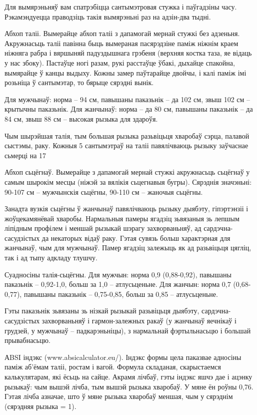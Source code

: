 Для вымярэньняў вам спатрэбіцца сантымэтровая стужка і паўгадзіны часу. Рэкамэндуецца праводзіць такія вымярэньні раз на адзін-два тыдні.

Абхоп таліі. Вымерайце абхоп таліі з дапамогай мернай стужкі без адзеньня. Акружнасьць таліі павінна быць вымераная пасярэдзіне паміж ніжнім краем ніжняга рабра і вяршыняй падуздышнага грэбеня (верхняя костка таза, яе відаць у нас збоку). Пастаўце ногі разам, рукі расстаўце ўбакі, дыхайце спакойна, вымярайце ў канцы выдыху. Кожны замер паўтарайце двойчы, і калі паміж імі розьніца ў сантымэтар, то бярыце сярэдні вынік.

Для мужчынаў: норма – 94 см, павышаны паказьнік – да 102 см, звыш 102 см – крытычны паказьнік. Для жанчынаў: норма – да 80 см, павышаны паказьнік – да 84 см, звыш 88 см – высокая рызыка для здароўя.

Чым шырэйшая талія, тым большая рызыка разьвіцьця хваробаў сэрца, палавой сыстэмы, раку. Кожныя 5 сантымэтраў на таліі павялічваюць рызыку заўчаснае сьмерці на 17%

Абхоп сьцёгнаў. Вымерайце з дапамогай мернай стужкі акружнасьць сьцёгнаў у самым шырокім месцы (ніжэй за вялікія сьцегнавыя бугры). Сярэднія значэньні: 90-107 см – мужчынскія сьцёгны, 90-110 см – жаночыя сьцёгны.

Занадта вузкія сьцёгны ў жанчынаў павялічваюць рызыку дыябэту, гіпэртэнзіі і жоўцекамянёвай хваробы. Нармальныя памеры ягадзіц зьвязаныя зь лепшым ліпідным профілем і меншай рызыкай шэрагу захворваньняў, ад сардэчна-сасудзістых да некаторых відаў раку. Гэтая сувязь больш характэрная для жанчынаў, чым для мужчынаў. Памер ягадзіц залежыць як ад разьвіцьця цягліц, так і ад тыпу адкладу тлушчу.

Суадносіны талія-сьцёгны. Для мужчын: норма 0,9 (0,88-0,92), павышаны паказьнік – 0,92-1,0, больш за 1,0 – атлусьценьне. Для жанчын: норма 0,7 (0,68-0,77), павышаны паказьнік – 0,75-0,85, больш за 0,85 – атлусьценьне.

Гэты паказьнік зьвязаны зь нізкай рызыкай разьвіцьця дыябэту, сардэчна-сасудзістых захворваньняў і гармон-залежных ракаў (у жанчынаў яечнікаў і грудзей, у мужчынаў – падкарэньніцы), з нармальнай фэртыльнасьцю і большай прывабнасьцю.

АBSI індэкс (www.absicalculator.eu/). Індэкс формы цела паказвае адносіны паміж аб'ёмам таліі, ростам і вагой. Формула складаная, скарыстаемся калькулятарам, які ёсьць на сайце. Акрамя лічбаў, гэты індэкс яшчэ дае і ацэнку рызыкаў: чым вышэй лічба, тым вышэй рызыка хваробаў. У мяне ён роўны 0,76. Гэтая лічба азначае, што ў мяне рызыка хваробаў меншая, чым у сярэднім (сярэдняя рызыка = 1).

